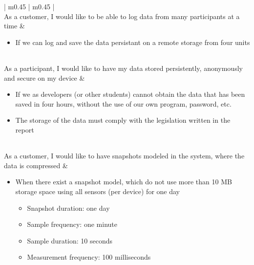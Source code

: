 \begin{center}
\begin{longtable}{| m{} | m{} |}
	 \\ \hline
	As a customer, I would like to be able to log data from many participants at a time & 
	\begin{itemize}[noitemsep,topsep=0pt,parsep=0pt,partopsep=0pt]
	 	\item If we can log and save the data persistant on a remote storage from four units
	 \end{itemize} \\ \hline
	As a participant, I would like to have my data stored persistently, anonymously and secure on my device  & 
	\begin{itemize}[noitemsep,topsep=0pt,parsep=0pt,partopsep=0pt]
	 	\item If we as developers (or other students) cannot obtain the data that has been saved in four hours, without the use of our own program, password, etc.
	 	\item The storage of the data must comply with the legislation written in the report
	 \end{itemize} \\ \hline
	As a customer, I would like to have snapshots modeled in the system, where the data is compressed & 
	\begin{itemize}[noitemsep,topsep=0pt,parsep=0pt,partopsep=0pt]
	 	\item When there exist a snapshot model, which do not use more than 10 MB storage space using all sensors (per device) for one day
	 		\begin{itemize}[noitemsep,topsep=0pt,parsep=0pt,partopsep=0pt]
	 			\item Snapshot duration: one day
	 			\item Sample frequency: one minute
	 			\item Sample duration: 10 seconds
	 			\item Measurement frequency: 100 milliseconds
	 		\end{itemize}
	 \end{itemize} \\ \hline


\end{longtable}
\end{center}
